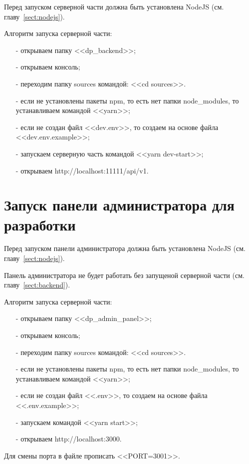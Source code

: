 Перед запуском серверной части должна быть установлена NodeJS (см. главу~\ref{sect:nodejs}).

Алгоритм запуска серверной части:
\begin{enumerate}
    \item[-] открываем папку <<dp\_backend>>;
    \item[-] открываем консоль;
    \item[-] переходим папку sources командой: <<cd sources>>.
    \item[-] если не установлены пакеты npm, то есть нет папки node\_modules, то устанавливаем командой <<yarn>>;
    \item[-] если не создан файл <<dev.env>>, то создаем на основе файла\\ <<dev.env.example>>;
    \item[-] запускаем серверную часть командой <<yarn dev-start>>;
    \item[-] открываем http://localhost:11111/api/v1.
\end{enumerate}

\newpage
\section{Запуск панели администратора для разработки}

Перед запуском панели администратора должна быть установлена NodeJS (см. главу~\ref{sect:nodejs}).

Панель администратора не будет работать без запущеной серверной части (см. главу~\ref{sect:backend}).

Алгоритм запуска серверной части:
\begin{enumerate}
    \item[-] открываем папку <<dp\_admin\_panel>>;
    \item[-] открываем консоль;
    \item[-] переходим папку sources командой: <<cd sources>>.
    \item[-] если не установлены пакеты npm, то есть нет папки node\_modules, то устанавливаем командой <<yarn>>;
    \item[-] если не создан файл <<.env>>, то создаем на основе файла <<.env.example>>;
    \item[-] запускаем командой <<yarn start>>;
    \item[-] открываем http://localhost:3000.
\end{enumerate}

Для смены порта в файле прописать <<PORT=3001>>.

